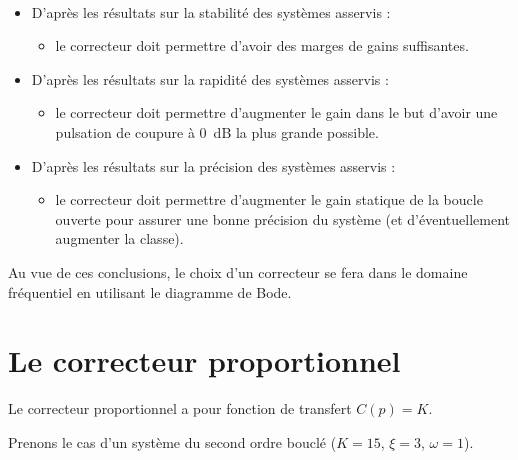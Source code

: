 \documentclass[10pt,fleqn]{article} %
\begin{document}
\begin{resultat} ~\\

\begin{itemize}
\item D'après les résultats sur la stabilité des systèmes asservis :
\begin{itemize}
\item le correcteur doit permettre d'avoir des marges de gains suffisantes.
\end{itemize}
\item D'après les résultats sur la rapidité des systèmes asservis :
\begin{itemize}
\item le correcteur doit permettre d'augmenter le gain dans le but d'avoir une pulsation de coupure à \SI{0}{dB} la plus grande possible.
\end{itemize}
\item D'après les résultats sur la précision des systèmes asservis :
\begin{itemize}
\item le correcteur doit permettre d'augmenter le gain statique de la boucle ouverte pour assurer une bonne précision du système (et d’éventuellement augmenter la classe).
\end{itemize}
\end{itemize}

Au vue de ces conclusions, le choix d'un correcteur se fera dans le domaine fréquentiel en utilisant le diagramme de Bode. 
\end{resultat}

\newpage

\section{Le correcteur proportionnel}

\begin{defi}

Le correcteur proportionnel a pour fonction de transfert $C(p)=K$.

\end{defi}

Prenons le cas d'un système du second ordre bouclé ($K=15$, $\xi=3$, $\omega=1$).
\end{document}
